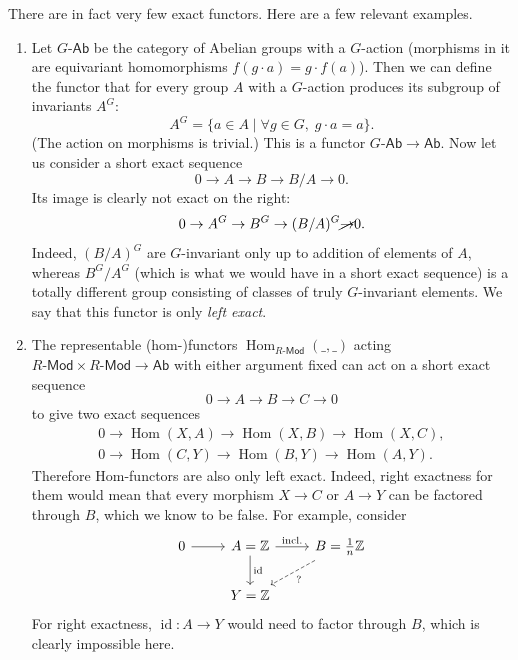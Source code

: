 \documentclass[english,letterpaper]{article}%
\numberwithin{equation}{section}
\numberwithin{figure}{section}
\numberwithin{table}{section}
\theoremstyle{definition}
\theoremstyle{definition}
\theoremstyle{definition}
\theoremstyle{plain}
\theoremstyle{plain}
\theoremstyle{plain}
\theoremstyle{plain}
\theoremstyle{remark}
\theoremstyle{remark}
\DeclareMathOperator{\id}{id}
\DeclareMathOperator{\Hom}{Hom}
\begin{document}
There are in fact very few exact functors. Here are a few relevant examples.

\begin{example}
    \begin{enumerate}
        \item Let $G\text{-}\mathsf{Ab}$ be the category of Abelian groups with a $G$-action (morphisms in it are equivariant homomorphisms $f(g\cdot a)=g\cdot f(a)$). Then we can define the functor that for every group $A$ with a $G$-action produces its subgroup of invariants $A^G$:
        \[A^G=\{a\in A\mid \forall g\in G,\; g\cdot a=a\}.\]
        (The action on morphisms is trivial.) This is a functor $G\text{-}\mathsf{Ab}\to\mathsf{Ab}$. Now let us consider a short exact sequence
        \[0\to A\to B\to B/A\to 0.\]
        Its image is clearly not exact on the right:
        \[0\to A^G\to B^G\to (B/A)^G \cancel{\to} 0.\]
        Indeed, $(B/A)^G$ are $G$-invariant only up to addition of elements of $A$, whereas $B^G/A^G$ (which is what we would have in a short exact sequence) is a totally different group consisting of classes of truly $G$-invariant elements. We say that this functor is only \emph{left exact}.
        \item The representable (hom-)functors $\Hom_{R\text{-}\mathsf{Mod}}(\_,\_)$ acting $R\text{-}\mathsf{Mod}\times R\text{-}\mathsf{Mod}\to \mathsf{Ab}$ with either argument fixed can act on a short exact sequence 
        \[0\to A\to B\to C\to 0\]
        to give two exact sequences
        \begin{eqnarray}
            0\to \Hom(X,A)\to \Hom(X,B)\to \Hom(X,C),\\
            0\to \Hom(C,Y)\to \Hom(B,Y)\to \Hom(A,Y).
        \end{eqnarray}
        Therefore Hom-functors are also only left exact. Indeed, right exactness for them would mean that every morphism $X\to C$ or $A\to Y$ can be factored through $B$, which we know to be false. For example, consider
        \[\begin{tikzcd}
        0\arrow[r]& A=\mathbb{Z}\arrow[r,"\text{incl.}"]\arrow[d,
        "\id"]& B=\frac{1}{n}\mathbb{Z}\arrow[dl,dashed,"?"] \\
         &Y=\mathbb{Z} &
        \end{tikzcd}\]
        For right exactness, $\id:A\to Y$ would need to factor through $B$, which is clearly impossible here.
        

\end{enumerate}
\end{example}
\end{document}
